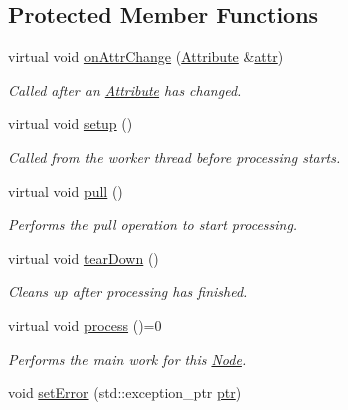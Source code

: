 \subsection*{Protected Member Functions}
\begin{DoxyCompactItemize}
\item 
virtual void \hyperlink{classdg_1_1deepcore_1_1_node_a535a4f006ea0572a863da4a3b409467f}{on\+Attr\+Change} (\hyperlink{classdg_1_1deepcore_1_1_attribute}{Attribute} \&\hyperlink{classdg_1_1deepcore_1_1_node_ac49c9fe2e0635198b791c58060e5aad2}{attr})
\begin{DoxyCompactList}\small\item\em Called after an \hyperlink{classdg_1_1deepcore_1_1_attribute}{Attribute} has changed. \end{DoxyCompactList}\item 
virtual void \hyperlink{classdg_1_1deepcore_1_1_node_a2efcf271a58556b5d1e961795885facb}{setup} ()
\begin{DoxyCompactList}\small\item\em Called from the worker thread before processing starts. \end{DoxyCompactList}\item 
virtual void \hyperlink{classdg_1_1deepcore_1_1_node_a3b0d2e8c397f3d039dea77b8c7fdf53e}{pull} ()
\begin{DoxyCompactList}\small\item\em Performs the {\ttfamily pull} operation to start processing. \end{DoxyCompactList}\item 
virtual void \hyperlink{classdg_1_1deepcore_1_1_node_ab602547ac51ca40c06b0c3d4073bb1f4}{tear\+Down} ()
\begin{DoxyCompactList}\small\item\em Cleans up after processing has finished. \end{DoxyCompactList}\item 
virtual void \hyperlink{classdg_1_1deepcore_1_1_node_aef240255b12a25d235fffa1c206e4925}{process} ()=0
\begin{DoxyCompactList}\small\item\em Performs the main work for this \hyperlink{classdg_1_1deepcore_1_1_node}{Node}. \end{DoxyCompactList}\item 
void \hyperlink{classdg_1_1deepcore_1_1_node_ae36897e066128a1104c0e77b8ff500f3}{set\+Error} (std\+::exception\+\_\+ptr \hyperlink{classdg_1_1deepcore_1_1_object_t_ab2513323757cee301fb419901535f7b1}{ptr})

\end{DoxyCompactItemize}
